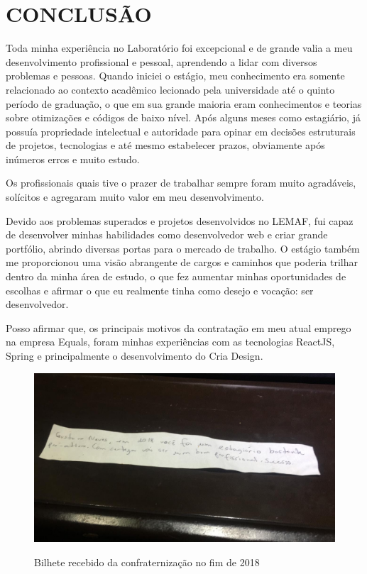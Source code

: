 \chapter{CONCLUSÃO}
\label{cap:conclusao}

Toda minha experiência no Laboratório foi excepcional e de grande valia a meu desenvolvimento profissional e pessoal, aprendendo a lidar com diversos problemas e pessoas.
Quando iniciei o estágio, meu conhecimento era somente relacionado ao contexto acadêmico lecionado pela universidade até o quinto período de graduação, o que em sua grande maioria eram conhecimentos e teorias sobre otimizações e códigos de baixo nível.
Após alguns meses como estagiário, já possuía propriedade intelectual e autoridade para opinar em decisões estruturais de projetos, tecnologias e até mesmo estabelecer prazos, obviamente após inúmeros erros e muito estudo.
 
Os profissionais quais tive o prazer de trabalhar sempre foram muito agradáveis, solícitos e agregaram muito valor em meu desenvolvimento.

Devido aos problemas superados e projetos desenvolvidos no LEMAF, fui capaz de desenvolver minhas habilidades como desenvolvedor web e criar grande portfólio, abrindo diversas portas para o mercado de trabalho.
O estágio também me proporcionou uma visão abrangente de cargos e caminhos que poderia trilhar dentro da minha área de estudo, o que fez aumentar minhas oportunidades de escolhas e afirmar o que eu realmente tinha como desejo e vocação: ser desenvolvedor.

Posso afirmar que, os principais motivos da contratação em meu atual emprego na empresa Equals, foram minhas experiências com as tecnologias ReactJS, Spring e principalmente o desenvolvimento do Cria Design.

\begin{figure}[H]
\centering
\caption{Bilhete recebido da confraternização no fim de 2018} %
\includegraphics[scale=0.3]{agradecimento}\\  %
\label{fig:exemplo} %
\end{figure}

